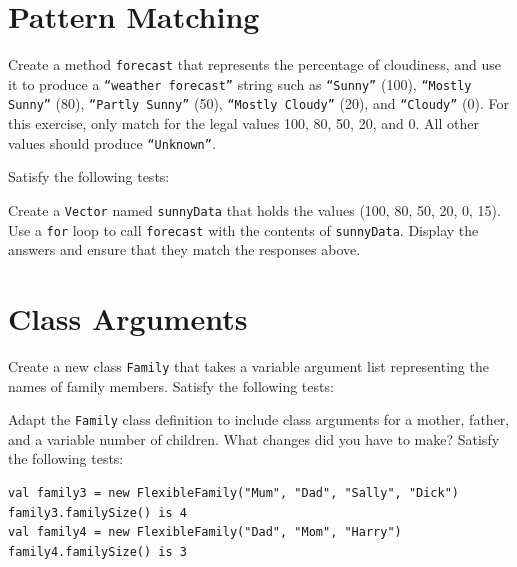 \documentclass[a4paper,12pt]{exam}
\begin{document}
\begin{questions}

\section*{Pattern Matching}	

\question
Create a method \texttt{forecast} that represents the percentage of cloudiness, 
and use it to produce a \verb!“weather forecast”! string such as \verb!“Sunny”! (100), 
\verb!“Mostly Sunny”! (80), \verb!“Partly Sunny”! (50), \verb!“Mostly Cloudy”! (20), 
and \verb!“Cloudy”! (0). For this exercise, only match for the legal 
values 100, 80, 50, 20, and 0. 
All other values should produce \verb!“Unknown”!. 

Satisfy the following tests:

\begin{solution}
\end{solution}

\question
Create a \texttt{Vector} named \texttt{sunnyData} that holds the values 
(100, 80, 50, 20, 0, 15). Use a \texttt{for} loop to call \texttt{forecast} 
with the contents of \texttt{sunnyData}. 
Display the answers and ensure that they match the responses above.
\begin{solution}
\end{solution}

\section*{Class Arguments}

\question
Create a new class \texttt{Family} that takes a variable argument list 
representing the names of family members. 
Satisfy the following tests:

\begin{solution}
\end{solution}

\question
Adapt the \texttt{Family} class definition to include class arguments for a mother, 
father, and a variable number of children. What changes did you have to make? 
Satisfy the following tests:
\begin{Verbatim}
val family3 = new FlexibleFamily("Mum", "Dad", "Sally", "Dick")
family3.familySize() is 4
val family4 = new FlexibleFamily("Dad", "Mom", "Harry") 
family4.familySize() is 3
\end{Verbatim}


\end{questions}
\end{document}
